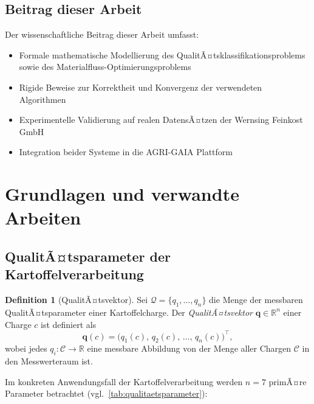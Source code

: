 ﻿\documentclass[12pt,a4paper]{article}
\theoremstyle{plain}
\theoremstyle{definition}
\newtheorem{definition}[theorem]{Definition}
\begin{document}
	\subsection{Beitrag dieser Arbeit}
	
	Der wissenschaftliche Beitrag dieser Arbeit umfasst:
	\begin{itemize}
		\item Formale mathematische Modellierung des QualitÃ¤tsklassifikationsproblems
		sowie des Materialfluss-Optimierungsproblems
		\item Rigide Beweise zur Korrektheit und Konvergenz der verwendeten Algorithmen
		\item Experimentelle Validierung auf realen DatensÃ¤tzen der
		Wernsing Feinkost GmbH
		\item Integration beider Systeme in die AGRI-GAIA Plattform
	\end{itemize}
	
	\section{Grundlagen und verwandte Arbeiten}
	
	\subsection{QualitÃ¤tsparameter der Kartoffelverarbeitung}
	
	\begin{definition}[QualitÃ¤tsvektor]
		Sei $\mathcal{Q} = \{q_1, \ldots, q_n\}$ die Menge der messbaren
		QualitÃ¤tsparameter einer Kartoffelcharge. Der \emph{QualitÃ¤tsvektor}
		$\mathbf{q} \in \mathbb{R}^n$ einer Charge $c$ ist definiert als
		\[
		\mathbf{q}(c) = \bigl(q_1(c),\, q_2(c),\, \ldots,\, q_n(c)\bigr)^{\!\top},
		\]
		wobei jedes $q_i : \mathcal{C} \to \mathbb{R}$ eine messbare Abbildung
		von der Menge aller Chargen $\mathcal{C}$ in den Messwerteraum ist.
	\end{definition}
	
	Im konkreten Anwendungsfall der Kartoffelverarbeitung werden $n = 7$
	primÃ¤re Parameter betrachtet (vgl.~\cref{tab:qualitaetsparameter}):
	
\end{document}
